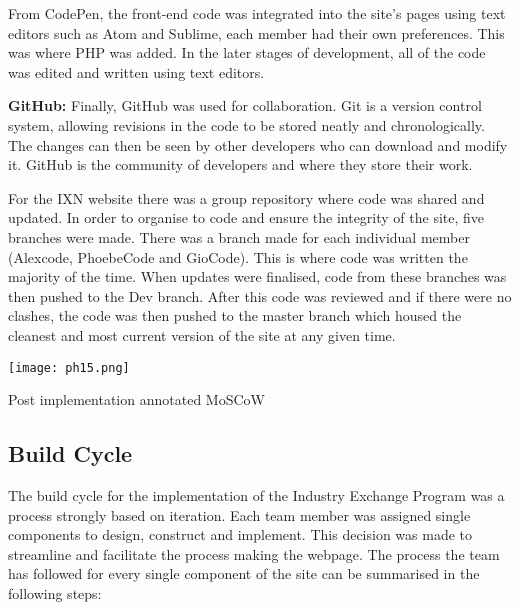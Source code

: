 \documentclass[fontsize=11pt]{extarticle}
\numberwithin{figure}{section} %
\begin{document}
From CodePen, the front-end code was integrated into the site's pages
using text editors such as Atom and Sublime, each member had their own
preferences. This was where PHP was added. In the later stages of
development, all of the code was edited and written using text editors.

\textbf{GitHub:} Finally, GitHub was used for collaboration. Git is a
version control system, allowing revisions in the code to be stored
neatly and chronologically. The changes can then be seen by other
developers who can download and modify it. \cite{p20} GitHub is the
community of developers and where they store their work.

For the IXN website there was a group repository where code was shared
and updated. In order to organise to code and ensure the integrity of
the site, five branches were made. There was a branch made for each
individual member (Alexcode, PhoebeCode and GioCode). This is where code
was written the majority of the time. When updates were finalised, code
from these branches was then pushed to the Dev branch. After this code
was reviewed and if there were no clashes, the code was then pushed to
the master branch which housed the cleanest and most current version of
the site at any given time.

\begin{table}[H]
      \centering
      \texttt{[image: ph15.png]}
      \caption{Post implementation annotated MoSCoW}
 \end{table}

\hypertarget{build-cycle}{%
\subsection{Build Cycle}\label{build-cycle}}

The build cycle for the implementation of the Industry Exchange Program
was a process strongly based on iteration. Each team member was assigned
single components to design, construct and implement. This decision was
made to streamline and facilitate the process making the webpage. The
process the team has followed for every single component of the site can
be summarised in the following steps:
\end{document}
